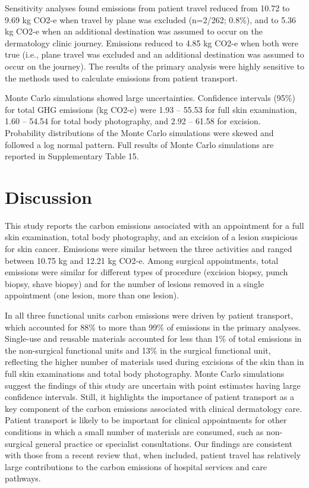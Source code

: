\begin{refsection}
Sensitivity analyses found emissions from patient travel reduced from 10.72 to 9.69 kg CO2-e when travel by plane was excluded (n=2/262; 0.8\%), and to 5.36 kg CO2-e when an additional destination was assumed to occur on the dermatology clinic journey. Emissions reduced to 4.85 kg CO2-e when both were true (i.e., plane travel was excluded and an additional destination was assumed to occur on the journey). The results of the primary analysis were highly sensitive to the methods used to calculate emissions from patient transport.

Monte Carlo simulations showed large uncertainties. Confidence intervals (95\%) for total GHG emissions (kg CO2-e) were 1.93 – 55.53 for full skin examination, 1.60 – 54.54 for total body photography, and 2.92 – 61.58 for excision. Probability distributions of the Monte Carlo simulations were skewed and followed a log normal pattern. Full results of Monte Carlo simulations are reported in Supplementary Table 15.




\section{Discussion}

This study reports the carbon emissions associated with an appointment for a full skin examination, total body photography, and an excision of a lesion suspicious for skin cancer. Emissions were similar between the three activities and ranged between 10.75 kg and 12.21 kg CO2-e. Among surgical appointments, total emissions were similar for different types of procedure (excision biopsy, punch biopsy, shave biopsy) and for the number of lesions removed in a single appointment (one lesion, more than one lesion). 

In all three functional units carbon emissions were driven by patient transport, which accounted for 88\% to more than 99\% of emissions in the primary analyses. Single-use and reusable materials accounted for less than 1\% of total emissions in the non-surgical functional units and 13\% in the surgical functional unit, reflecting the higher number of materials used during excisions of the skin than in full skin examinations and total body photography. Monte Carlo simulations suggest the findings of this study are uncertain with point estimates having large confidence intervals. Still, it highlights the importance of patient transport as a key component of the carbon emissions associated with clinical dermatology care. Patient transport is likely to be important for clinical appointments for other conditions in which a small number of materials are consumed, such as non-surgical general practice or specialist consultations. Our findings are consistent with those from a recent review that, when included, patient travel has relatively large contributions to the carbon emissions of hospital services and care pathways.\cite{kouwenberg_carbon_2024}


\end{refsection}
